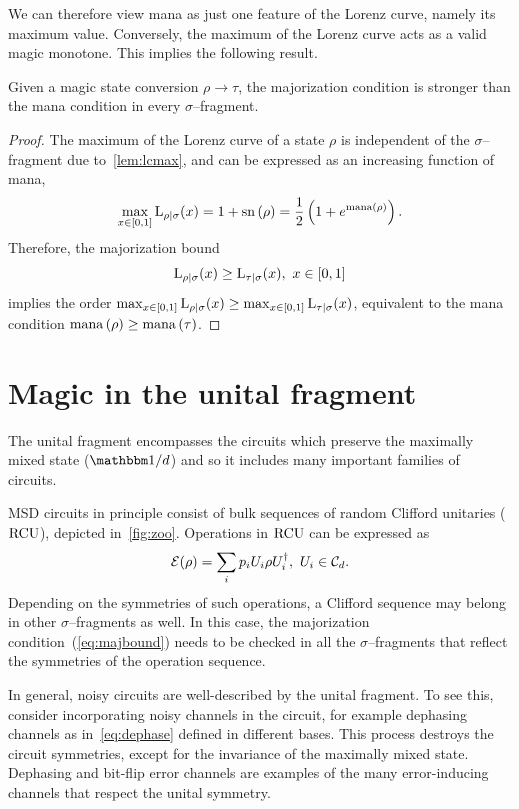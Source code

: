 \documentclass[pra,
aps,
twocolumn,
superscriptaddress,
groupedaddress,
nofootinbib,
reprint
]{revtex4-1}
\begin{document}
We can therefore view mana as just one feature of the Lorenz curve, namely its maximum value. 
Conversely, the maximum of the Lorenz curve acts as a valid magic monotone.
This implies the following result.
\begin{theorem}\label{thm:bounds}
    Given a magic state conversion $\rho \longrightarrow \tau$, the majorization condition is stronger than the mana condition in every $\sigma$--fragment.
\end{theorem}
\begin{proof}
    The maximum of the Lorenz curve of a state $\rho$ is independent of the $\sigma$--fragment due to~\cref{lem:lcmax}, and can be expressed as an increasing function of mana,
    \begin{equation}
        \max_{x\in[0,1]}{{{\rm{L}}_{\rho|\sigma}}(x)} = 1 + {{\rm{sn}}\left(\rho\right)} = \frac{1}{2} \left( 1 + e^{{\rm{mana}}\left(\rho\right)} \right).
    \end{equation}
    Therefore, the majorization bound
    \begin{equation}
    	\lc{\rho}{\sigma}(x) \geq \lc{\tau}{\sigma}(x),\ x\in[0,1]
    \end{equation}
    implies the order $\max_{x\in[0,1]}{{{\rm{L}}_{\rho|\sigma}}(x)} \geq \max_{x\in[0,1]}{{{\rm{L}}_{\tau|\sigma}}(x)}$, equivalent to the mana condition ${{\rm{mana}}\left(\rho\right)} \geq {{\rm{mana}}\left(\tau\right)}$.
\end{proof}

\section{Magic in the unital fragment}\label{sec:unital}
The unital fragment encompasses the circuits which preserve the maximally mixed state ($\id/d$) and so it includes many important families of circuits.

MSD circuits in principle consist of bulk sequences of random Clifford unitaries (${\rm{RCU}}$), depicted in~\cref{fig:zoo}.
Operations in ${\rm{RCU}}$ can be expressed as
\begin{equation}
    \mathcal{E}(\rho) = \sum_i p_i U_i \rho U_i^\dagger,\ U_i \in \mathcal{C}_d.
\end{equation}
Depending on the symmetries of such operations, a Clifford sequence may belong in other $\sigma$--fragments as well.
In this case, the majorization condition~(\ref{eq:majbound}) needs to be checked in all the $\sigma$--fragments that reflect the symmetries of the operation sequence.

In general, noisy circuits are well-described by the unital fragment.
To see this, consider incorporating noisy channels in the circuit, for example dephasing channels as in~\cref{eq:dephase} defined in different bases.
This process destroys the circuit symmetries, except for the invariance of the maximally mixed state.
Dephasing and bit-flip error channels are examples of the many error-inducing channels that respect the unital symmetry. 
\end{document}
